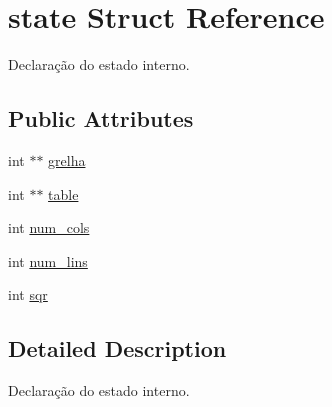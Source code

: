 \hypertarget{structstate}{\section{state Struct Reference}
\label{structstate}
}


Declaração do estado interno.  


\subsection*{Public Attributes}
\begin{DoxyCompactItemize}
\item 
int $\ast$$\ast$ \hyperlink{structstate_a38d05acc88f631f12c61832a59232fb7}{grelha}
\item 
int $\ast$$\ast$ \hyperlink{structstate_afc35996998683ce23fb7921410d2f0e4}{table}
\item 
int \hyperlink{structstate_a7fd2fa9e464accceb3da4c76e2198c56}{num\+\_\+cols}
\item 
int \hyperlink{structstate_a997de7249db5ec85946483c68d0a74a0}{num\+\_\+lins}
\item 
int \hyperlink{structstate_a9e68c04f3074848d9162c2429a88876b}{sqr}
\end{DoxyCompactItemize}


\subsection{Detailed Description}
Declaração do estado interno. 

